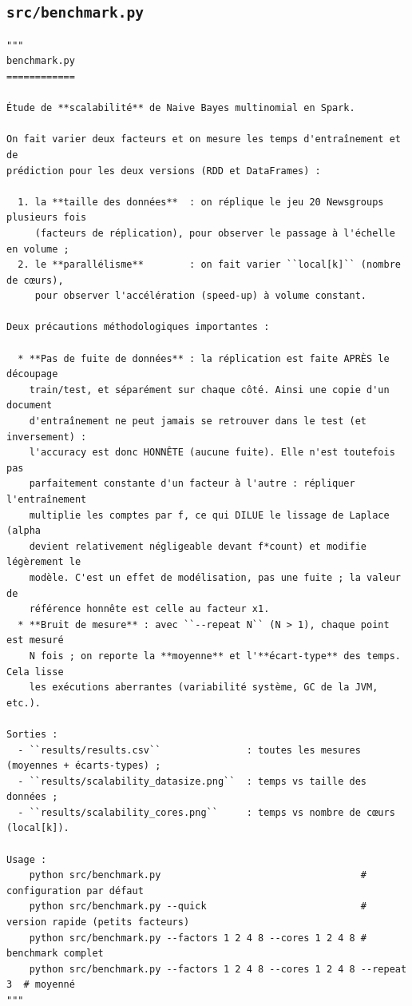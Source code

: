 \subsection{\texttt{src/benchmark.py}}
\begin{lstlisting}[style=py]
"""
benchmark.py
============

Étude de **scalabilité** de Naive Bayes multinomial en Spark.

On fait varier deux facteurs et on mesure les temps d'entraînement et de
prédiction pour les deux versions (RDD et DataFrames) :

  1. la **taille des données**  : on réplique le jeu 20 Newsgroups plusieurs fois
     (facteurs de réplication), pour observer le passage à l'échelle en volume ;
  2. le **parallélisme**        : on fait varier ``local[k]`` (nombre de cœurs),
     pour observer l'accélération (speed-up) à volume constant.

Deux précautions méthodologiques importantes :

  * **Pas de fuite de données** : la réplication est faite APRÈS le découpage
    train/test, et séparément sur chaque côté. Ainsi une copie d'un document
    d'entraînement ne peut jamais se retrouver dans le test (et inversement) :
    l'accuracy est donc HONNÊTE (aucune fuite). Elle n'est toutefois pas
    parfaitement constante d'un facteur à l'autre : répliquer l'entraînement
    multiplie les comptes par f, ce qui DILUE le lissage de Laplace (alpha
    devient relativement négligeable devant f*count) et modifie légèrement le
    modèle. C'est un effet de modélisation, pas une fuite ; la valeur de
    référence honnête est celle au facteur x1.
  * **Bruit de mesure** : avec ``--repeat N`` (N > 1), chaque point est mesuré
    N fois ; on reporte la **moyenne** et l'**écart-type** des temps. Cela lisse
    les exécutions aberrantes (variabilité système, GC de la JVM, etc.).

Sorties :
  - ``results/results.csv``               : toutes les mesures (moyennes + écarts-types) ;
  - ``results/scalability_datasize.png``  : temps vs taille des données ;
  - ``results/scalability_cores.png``     : temps vs nombre de cœurs (local[k]).

Usage :
    python src/benchmark.py                                   # configuration par défaut
    python src/benchmark.py --quick                           # version rapide (petits facteurs)
    python src/benchmark.py --factors 1 2 4 8 --cores 1 2 4 8 # benchmark complet
    python src/benchmark.py --factors 1 2 4 8 --cores 1 2 4 8 --repeat 3  # moyenné
"""


\end{lstlisting}
